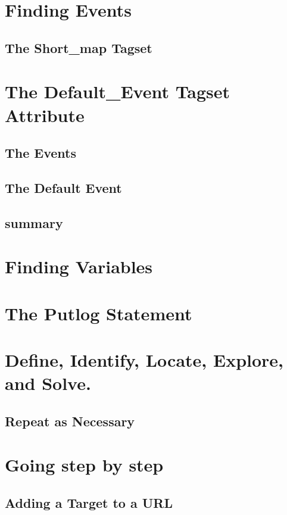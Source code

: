 \documentclass{book}
\begin{document}
\section{Finding Events}

\subsection{The Short\_map Tagset}

\section{The Default\_Event Tagset Attribute}

\subsection{The Events}

\subsection{The Default Event}

\subsection{summary}

\section{Finding Variables}

\section{The Putlog Statement}

\section{Define, Identify, Locate, Explore, and Solve.}

\subsection{Repeat as Necessary}

\section{Going step by step}

\subsection{Adding a Target to a URL}
\end{document}
